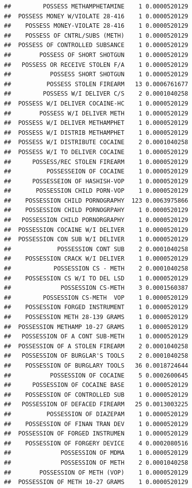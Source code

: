 \documentclass[]{book}
\begin{document}
\begin{verbatim}
##         POSSESS METHAMPHETAMINE    1 0.0000520129
##  POSSESS MONEY W/VIOLATE 28-416    1 0.0000520129
##    POSSESS MONEY-VIOLATE 28-416    1 0.0000520129
##    POSSESS OF CNTRL/SUBS (METH)    1 0.0000520129
##  POSSESS OF CONTROLLED SUBSANCE    1 0.0000520129
##        POSSESS OF SHORT SHOTGUN    1 0.0000520129
##   POSSESS OR RECEIVE STOLEN F/A    1 0.0000520129
##           POSSESS SHORT SHOTGUN    1 0.0000520129
##          POSSESS STOLEN FIREARM   13 0.0006761677
##         POSSESS W/I DELIVER C/S    2 0.0001040258
##  POSSESS W/I DELIVER COCAINE-HC    1 0.0000520129
##        POSSESS W/I DELIVER METH    1 0.0000520129
##  POSSESS W/I DELIVER METHAMPHET    1 0.0000520129
##  POSSESS W/I DISTRIB METHAMPHET    1 0.0000520129
##  POSSESS W/I DISTRIBUTE COCAINE    2 0.0001040258
##  POSSESS W/I TO DELIVER COCAINE    1 0.0000520129
##      POSSESS/REC STOLEN FIREARM    1 0.0000520129
##          POSSESSEION OF COCAINE    1 0.0000520129
##      POSSESSEION OF HASHISH-VOP    1 0.0000520129
##       POSSESSION CHILD PORN-VOP    1 0.0000520129
##    POSSESSION CHILD PORNOGRAPHY  123 0.0063975866
##    POSSESSION CHILD PORNOGRPAHY    1 0.0000520129
##   POSSESSION CHILD PORNORGRAPHY    1 0.0000520129
##  POSSESSION COCAINE W/I DELIVER    1 0.0000520129
##  POSSESSION CON SUB W/I DELIVER    1 0.0000520129
##             POSSESSION CONT SUB    2 0.0001040258
##    POSSESSION CRACK W/I DELIVER    1 0.0000520129
##            POSSESSION CS - METH    2 0.0001040258
##    POSSESSION CS W/I TO DEL LSD    1 0.0000520129
##              POSSESSION CS-METH    3 0.0001560387
##         POSSESSION CS-METH  VOP    1 0.0000520129
##    POSSESSION FORGED INSTRUMENT    1 0.0000520129
##    POSSESSION METH 28-139 GRAMS    1 0.0000520129
##  POSSESSION METHAMP 10-27 GRAMS    1 0.0000520129
##   POSSESSION OF A CONT SUB-METH    1 0.0000520129
##  POSSESSION OF A STOLEN FIREARM    2 0.0001040258
##   POSSESSION OF BURGLAR'S TOOLS    2 0.0001040258
##    POSSESSION OF BURGLARY TOOLS   36 0.0018724644
##           POSSESSION OF COCAINE    5 0.0002600645
##      POSSESSION OF COCAINE BASE    1 0.0000520129
##    POSSESSION OF CONTROLLED SUB    1 0.0000520129
##   POSSESSION OF DEFACED FIREARM   25 0.0013003225
##          POSSESSION OF DIAZEPAM    1 0.0000520129
##    POSSESSION OF FINAN TRAN DEV    1 0.0000520129
##  POSSESSION OF FORGED INSTRUMEN    1 0.0000520129
##    POSSESSION OF FORGERY DEVICE    4 0.0002080516
##              POSSESSION OF MDMA    1 0.0000520129
##              POSSESSION OF METH    2 0.0001040258
##        POSSESSION OF METH (VOP)    1 0.0000520129
##  POSSESSION OF METH 10-27 GRAMS    1 0.0000520129

\end{verbatim}
\end{document}
